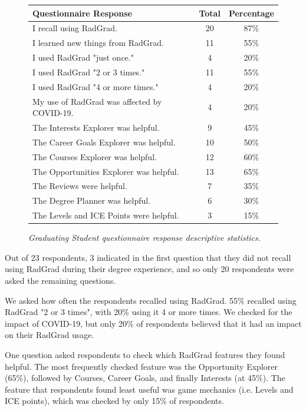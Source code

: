 \documentclass[acmsmall]{acmart}
\begin{document}
\begin{figure}[th]
\centering
\small
\begin{tabular}{ p{4in} c c }
\hline
 Questionnaire Response &  Total & Percentage   \\
\hline
I recall using RadGrad.                          & 20 & 87\% \\
I learned new things from RadGrad.               & 11 & 55\% \\
I used RadGrad "just once."                      & 4 & 20\% \\
I used RadGrad "2 or 3 times."                   & 11 & 55\% \\
I used RadGrad "4 or more times."                & 4 & 20\% \\
My use of RadGrad was affected by COVID-19.         & 4 & 20\% \\
The Interests Explorer was helpful.              & 9 & 45\% \\
The Career Goals Explorer was helpful.           & 10 & 50\% \\
The Courses Explorer was helpful.                & 12 & 60\% \\
The Opportunities Explorer was helpful.          & 13 & 65\% \\
The Reviews were helpful.                        & 7 & 35\% \\
The Degree Planner was helpful.                  & 6 & 30\% \\
The Levels and ICE Points were helpful.          & 3 & 15\% \\
\hline
\end{tabular}
\caption{\em Graduating Student questionnaire response descriptive statistics.}
\normalsize
\label{fig:graduating-student-questionnaire-responses}
\end{figure}

Out of 23 respondents, 3 indicated in the first question that they did not recall using RadGrad during their degree experience, and so only 20 respondents were asked the remaining questions.

We asked how often the respondents recalled using RadGrad. 55\% recalled using RadGrad "2 or 3 times", with 20\% using it 4 or more times. We checked for the impact of COVID-19, but only 20\% of respondents believed that it had an impact on their RadGrad usage.

One question asked respondents to check which RadGrad features they found helpful.  The most frequently checked feature was the Opportunity Explorer (65\%), followed by Courses, Career Goals, and finally Interests (at 45\%).  The feature that respondents found least useful was game mechanics (i.e. Levels and ICE points), which was checked by only 15\% of respondents.
\end{document}
